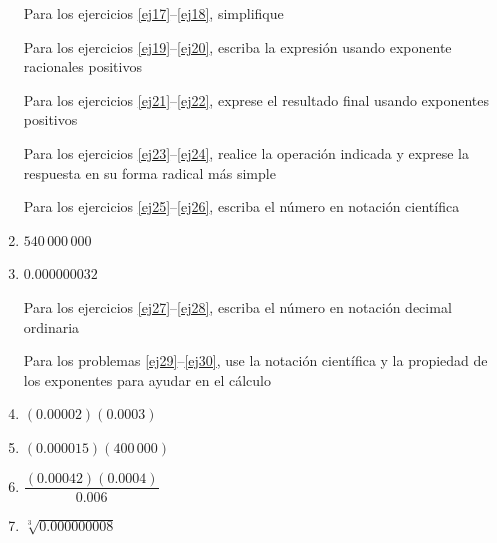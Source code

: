 \documentclass[twoside,letterpaper]{article}
\begin{document}
\begin{multicols}{2}
\begin{enumerate}
Para los ejercicios \ref{ej17}--\ref{ej18}, simplifique
Para los ejercicios \ref{ej19}--\ref{ej20}, escriba la expresión usando exponente racionales positivos
Para los ejercicios \ref{ej21}--\ref{ej22}, exprese el resultado final usando exponentes positivos
Para los ejercicios \ref{ej23}--\ref{ej24}, realice la operación indicada y exprese la respuesta en su forma radical más simple
Para los ejercicios \ref{ej25}--\ref{ej26}, escriba el número en notación científica
\item \label{ej25} $540\,000\,000$
\item \label{ej26} $0.000000032$

Para los ejercicios \ref{ej27}--\ref{ej28}, escriba el número en notación decimal ordinaria
Para los problemas \ref{ej29}--\ref{ej30}, use la notación científica y la propiedad de los exponentes para ayudar en el cálculo
\item \label{ej29} $(0.00002)(0.0003)$
\item $(0.000015)(400\,000)$
\item $\dfrac{(0.00042)(0.0004)}{0.006}$
\item $\sqrt[3]{0.000000008}$ \label{ej30}

\end{enumerate}
\end{multicols}
\end{document}
